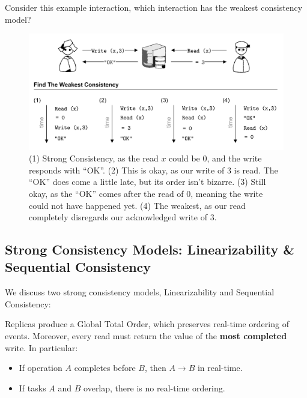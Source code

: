 \noindent
Consider this example interaction, which interaction has the weakest consistency model?

\begin{figure}[h]
    \centering
    \includegraphics[width=\textwidth]{Sections/consist/consist.png}
    \caption{(1) Strong Consistency, as the read $x$ could be 0, and the write responds with ``OK''. (2) This is okay, as our write of 3 is read. The ``OK'' does come a little late, but its order isn't bizarre. (3) Still okay, as the ``OK'' comes after the read of 0, meaning the write could not have happened yet. (4) The weakest, as our read completely disregards our acknowledged write of 3.}
\end{figure}

\vspace{-1em}
\subsection{Strong Consistency Models: Linearizability \& Sequential Consistency}

We discuss two strong consistency models, Linearizability and Sequential Consistency:

\begin{Def}[Linearizability]
    
   Replicas produce a Global Total Order, which preserves real-time ordering of events.
   Moreover, every read must return the value of the \textbf{most completed} write. In particular:
   \begin{itemize}
    \item If operation $A$ completes before $B$, then $A\rightarrow B$ in real-time.
    \item If tasks $A$ and $B$ overlap, there is no real-time ordering.
   \end{itemize}
\end{Def}

